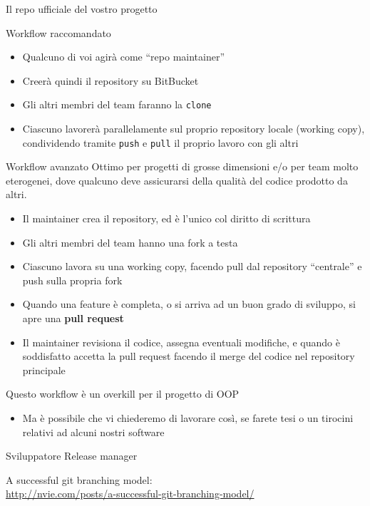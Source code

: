 \documentclass[presentation]{beamer}
\begin{document}
\begin{frame}[allowframebreaks]{Il repo ufficiale del vostro progetto}
	\begin{block}{Workflow raccomandato}
		\begin{itemize}
			\item Qualcuno di voi agirà come ``repo maintainer''
			\item Creerà quindi il repository su BitBucket
			\item Gli altri membri del team faranno la \texttt{clone}
			\item Ciascuno lavorerà parallelamente sul proprio repository locale (working copy), condividendo tramite \texttt{push} e \texttt{pull} il proprio lavoro con gli altri
		\end{itemize}
	\end{block}
	\begin{block}{Workflow avanzato}
		Ottimo per progetti di grosse dimensioni e/o per team molto eterogenei, dove qualcuno deve assicurarsi della qualità del codice prodotto da altri.
		\begin{itemize}
			\item Il maintainer crea il repository, ed è l'unico col diritto di scrittura
			\item Gli altri membri del team hanno una fork a testa
			\item Ciascuno lavora su una working copy, facendo pull dal repository ``centrale'' e push sulla propria fork
			\item Quando una feature è completa, o si arriva ad un buon grado di sviluppo, si apre una \textbf{pull request}
			\item Il maintainer revisiona il codice, assegna eventuali modifiche, e quando è soddisfatto accetta la pull request facendo il merge del codice nel repository principale
		\end{itemize}
		Questo workflow è un overkill per il progetto di OOP
		\begin{itemize}
			\item Ma è possibile che vi chiederemo di lavorare così, se farete tesi o un tirocini relativi ad alcuni nostri software
		\end{itemize}
	\end{block}
\end{frame}

 {
	Sviluppatore
	Release manager
}

 {
A successful git branching model:\\
\url{http://nvie.com/posts/a-successful-git-branching-model/}
}
\end{document}
